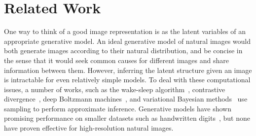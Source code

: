 \documentclass[10pt,twocolumn,letterpaper]{article}
\begin{document}
\section{Related Work}
\vspace{-0.05in}
One way to think of a good image representation is as the latent variables of an appropriate generative model. 
An ideal generative model of natural images would both generate images according to their natural distribution, and be concise in the sense that it would seek common causes for different images and share information between them.
However, inferring the latent structure given an image is intractable for even relatively simple models.
To deal with these computational issues, a number of works, such as the wake-sleep algorithm~\cite{hinton1995wake}, contrastive divergence~\cite{hinton2006fast}, deep Boltzmann machines~\cite{salakhutdinov2009deep}, and variational Bayesian methods~\cite{kingma2014,rezende2014stochastic} use sampling to perform approximate inference. Generative models have shown promising performance on smaller datasets such as handwritten digits~\cite{hinton1995wake,hinton2006fast,salakhutdinov2009deep,kingma2014,rezende2014stochastic}, but none have proven effective for high-resolution natural images.

\end{document}
